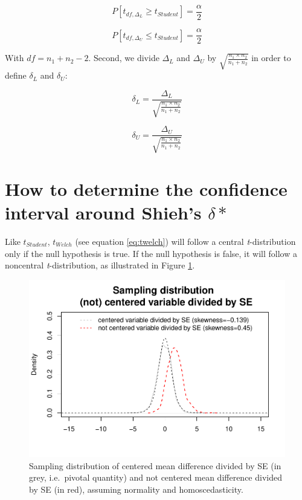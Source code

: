\documentclass[
  man,floatsintext]{apa6}
\begin{document}
\[P[t_{df, \Delta_L} \geq t_{Student}] = \frac{\alpha}{2} \]

\[P[t_{df, \Delta_U} \leq t_{Student}] = \frac{\alpha}{2} \]

With \(df = n_1+n_2-2\). Second, we divide \(\Delta_L\) and \(\Delta_U\) by \(\sqrt{\frac{n_1 \times n_2}{n_1 + n_2}}\) in order to define \(\delta_L\) and \(\delta_U\):

\[\delta_L = \frac{\Delta_L}{\sqrt{\frac{n_1 \times n_2}{n_1 + n_2}}}\]

\[\delta_U = \frac{\Delta_U}{\sqrt{\frac{n_1 \times n_2}{n_1 + n_2}}}\]

\hypertarget{how-to-determine-the-confidence-interval-around-shiehs-delta}{%
\section{\texorpdfstring{How to determine the confidence interval around Shieh's \(\delta*\)}{How to determine the confidence interval around Shieh's \textbackslash delta*}}\label{how-to-determine-the-confidence-interval-around-shiehs-delta}}

Like \(t_{Student}\), \(t_{Welch}\) (see equation \eqref{eq:twelch}) will follow a central \emph{t}-distribution only if the null hypothesis is true. If the null hypothesis is false, it will follow a noncentral \emph{t}-distribution, as illustrated in Figure \ref{fig:SAMPLMEANDIFF4}.

\begin{figure}
\centering
\includegraphics{CI_files/figure-latex/SAMPLMEANDIFF4-1.pdf}
\caption{\label{fig:SAMPLMEANDIFF4}Sampling distribution of centered mean difference divided by SE (in grey, i.e.~pivotal quantity) and not centered mean difference divided by SE (in red), assuming normality and homoscedasticity.}
\end{figure}
\end{document}
